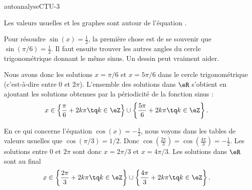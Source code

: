 
\begin{corrige}{autoanalyseCTU-3}

    \begin{wrapfigure}{r}{5.0cm}
   \vspace{-0.5cm}        %
   \centering
   
\end{wrapfigure}

Les valeurs usuelles et les graphes sont autour de l'équation \pageref{PGooIMQFooTnBdIl}.

Pour résoudre \( \sin(x)=\frac{ 1 }{2}\), la première chose est de se souvenir que \( \sin(\pi/6)=\frac{ 1 }{2}\). Il faut ensuite trouver les autres angles du cercle trigonométrique donnant le même sinus. Un dessin peut vraiment aider.

Nous avons donc les solutions \( x=\pi/6\) et \( x=5\pi/6\) dans le cercle trigonométrique (c'est-à-dire entre \( 0\) et \( 2\pi\)). L'ensemble des solutions dans \( \eR\) s'obtient en ajoutant les solutions obtenues par la périodicité de la fonction sinus :
\begin{equation}
    x\in\left\{ \frac{ \pi }{ 6 }+2k\pi\tq k\in \eZ \right\}\cup\left\{ \frac{ 5\pi }{ 6 }+2k\pi\tq k\in \eZ \right\}.
\end{equation}

En ce qui concerne l'équation \( \cos(x)=-\frac{ 1 }{2}\), nous voyons dans les tables de valeurs usuelles que \( \cos(\pi/3)=1/2\). Donc \( \cos(\frac{ 2\pi }{ 3 })=\cos(\frac{ 4\pi }{ 3 })=-\frac{ 1 }{2}\). Les solutions entre \( 0\) et \( 2\pi\) sont donc \( x=2\pi/3\) et \( x=4\pi/3\). Les solutions dans \( \eR\) sont au final
\begin{equation}
    x\in\left\{ \frac{ 2\pi }{ 3 }+2k\pi\tq k\in \eZ \right\}\cup\left\{ \frac{ 4\pi }{ 3 }+2k\pi\tq k\in \eZ \right\}.
\end{equation}

\end{corrige}   
